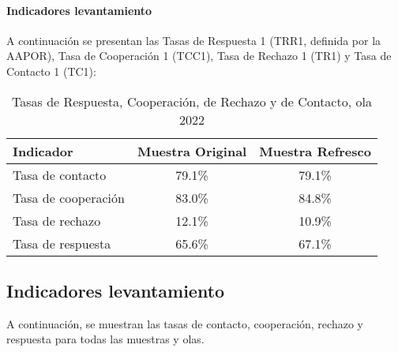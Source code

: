 \documentclass[
  12pt,
]{article}
\begin{document}
\hypertarget{indicadores-levantamiento-5}{%
\paragraph*{Indicadores levantamiento}\label{indicadores-levantamiento-5}}

A continuación se presentan las Tasas de Respuesta 1 (TRR1, definida por la AAPOR), Tasa de Cooperación 1 (TCC1), Tasa de Rechazo 1 (TR1) y Tasa de Contacto 1 (TC1):

\begin{table}[H]

\caption{\label{tab:tabla-tasas-ola6}Tasas de Respuesta, Cooperación, de Rechazo y de Contacto, ola 2022}
\centering
\begin{tabular}[t]{lcc}
\toprule
Indicador & Muestra Original & Muestra Refresco\\
\midrule
Tasa de contacto & 79.1\% & 79.1\%\\
Tasa de cooperación & 83.0\% & 84.8\%\\
Tasa de rechazo & 12.1\% & 10.9\%\\
Tasa de respuesta & 65.6\% & 67.1\%\\
\bottomrule
\end{tabular}
\end{table}

\hypertarget{indicadores-levantamiento-6}{%
\subsection{Indicadores levantamiento}\label{indicadores-levantamiento-6}}

A continuación, se muestran las tasas de contacto, cooperación, rechazo y respuesta para todas las muestras y olas.
\end{document}
